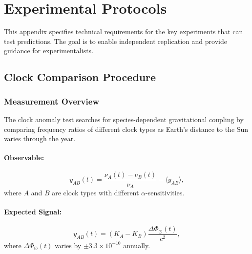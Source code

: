 
\section{Experimental Protocols}\label{app:protocols-D}

This appendix specifies technical requirements for the key experiments 
that can test \DFD predictions. The goal is to enable independent 
replication and provide guidance for experimentalists.

\subsection{Clock Comparison Procedure}\label{app:clock_protocol}

\subsubsection{Measurement Overview}

The clock anomaly test searches for species-dependent gravitational 
coupling by comparing frequency ratios of different clock types as 
Earth's distance to the Sun varies through the year.

\paragraph{Observable:}
\begin{equation}
y_{AB}(t) = \frac{\nu_A(t) - \nu_B(t)}{\nu_A} - \langle y_{AB}\rangle,
\end{equation}
where $A$ and $B$ are clock types with different $\alpha$-sensitivities.

\paragraph{Expected Signal:}
\begin{equation}
y_{AB}(t) = (K_A - K_B)\frac{\Delta\Phi_\odot(t)}{c^2},
\end{equation}
where $\Delta\Phi_\odot(t)$ varies by $\pm 3.3 \times 10^{-10}$ annually.

